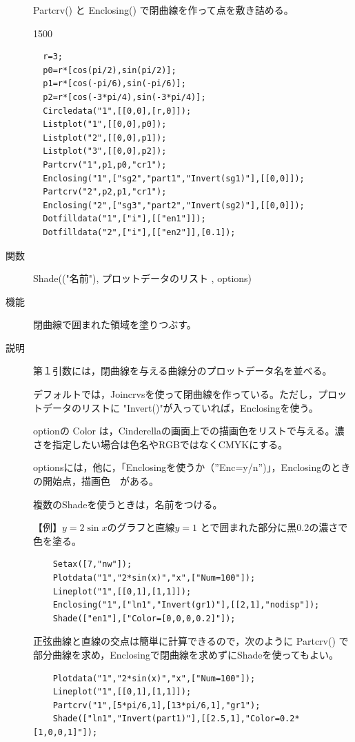 \documentclass[papersize,a4paper,12pt,uplatex]{jsarticle}
\begin{document}
\begin{description}
Partcrv() と Enclosing() で閉曲線を作って点を敷き詰める。

\begin{layer}{150}{0}
\end{layer}
\begin{verbatim}
  r=3;
  p0=r*[cos(pi/2),sin(pi/2)];
  p1=r*[cos(-pi/6),sin(-pi/6)];
  p2=r*[cos(-3*pi/4),sin(-3*pi/4)];
  Circledata("1",[[0,0],[r,0]]);
  Listplot("1",[[0,0],p0]);
  Listplot("2",[[0,0],p1]);
  Listplot("3",[[0,0],p2]);
  Partcrv("1",p1,p0,"cr1");
  Enclosing("1",["sg2","part1","Invert(sg1)"],[[0,0]]);
  Partcrv("2",p2,p1,"cr1");
  Enclosing("2",["sg3","part2","Invert(sg2)"],[[0,0]]);
  Dotfilldata("1",["i"],[["en1"]]);
  Dotfilldata("2",["i"],[["en2"]],[0.1]);
\end{verbatim}

\vspace{\baselineskip}
\hypertarget{shade}{}
\item[関数]  Shade(("名前"), プロットデータのリスト , options)
\item[機能]  閉曲線で囲まれた領域を塗りつぶす。
\item[説明]  第１引数には，閉曲線を与える曲線分のプロットデータ名を並べる。

デフォルトでは，Joincrvsを使って閉曲線を作っている。ただし，プロットデータのリストに
"Invert()"が入っていれば，Enclosingを使う。

optionの Color は，Cinderellaの画面上での描画色をリストで与える。濃さを指定したい場合は色名やRGBではなくCMYKにする。

optionsには，他に，「Enclosingを使うか（''Enc=y/n'')」，Enclosingのときの開始点，描画色　がある。
  
複数のShadeを使うときは，名前をつける。

\vspace{\baselineskip}
【例】$y=2\sin x$のグラフと直線$y=1$ とで囲まれた部分に黒0.2の濃さで色を塗る。
\begin{verbatim}
    Setax([7,"nw"]);
    Plotdata("1","2*sin(x)","x",["Num=100"]);
    Lineplot("1",[[0,1],[1,1]]);
    Enclosing("1",["ln1","Invert(gr1)"],[[2,1],"nodisp"]);
    Shade(["en1"],["Color=[0,0,0,0.2]"]);
\end{verbatim}
\begin{center}  \end{center}

正弦曲線と直線の交点は簡単に計算できるので，次のように Partcrv() で部分曲線を求め，Enclosingで閉曲線を求めずにShadeを使ってもよい。
\begin{verbatim}
    Plotdata("1","2*sin(x)","x",["Num=100"]);
    Lineplot("1",[[0,1],[1,1]]);
    Partcrv("1",[5*pi/6,1],[13*pi/6,1],"gr1");
    Shade(["ln1","Invert(part1)"],[[2.5,1],"Color=0.2*[1,0,0,1]"]);
\end{verbatim}



\end{description}
\end{document}
